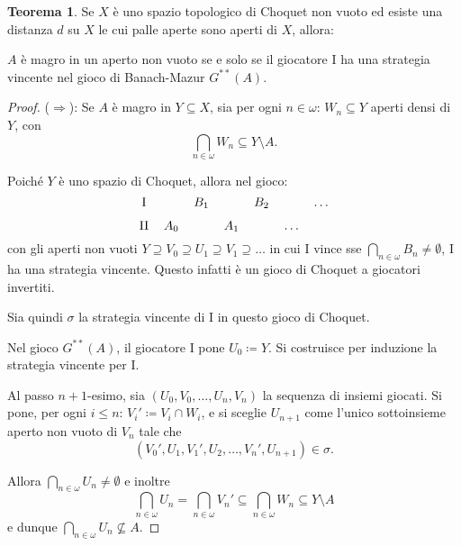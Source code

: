 \documentclass[titlepage]{article}
\newcommand{\1}{\mathds{1}}
\theoremstyle{definition}%
\newtheorem{thm}{Teorema}[section]
\theoremstyle{plain}
\theoremstyle{remark}
\begin{document}
\begin{thm}\label{sec:orged1da91}
Se \(X\) è uno {spazio topologico} {di Choquet} non {vuoto} ed esiste una {distanza} \(d\) su \(X\) le cui {palle aperte} sono aperti di \(X\), allora:

\(A\) è {magro} in un {aperto} non vuoto se e solo se il giocatore I ha una {strategia vincente} nel {gioco di Banach-Mazur} \(G^{**}(A)\).
\end{thm}
\begin{proof}
(\(\Rightarrow\)): Se \(A\) è magro in \(Y \subseteq X\), sia per ogni \(n \in \omega\): \(W_{n} \subseteq Y\) aperti densi di \(Y\), con
\begin{equation*}
\bigcap_{n \in\omega} W_{n} \subseteq Y \setminus A.
\end{equation*}

Poiché \(Y\) è uno spazio di Choquet, allora nel gioco:
\begin{equation*}
\begin{tikzcd}[ampersand replacement=\&,cramped, sep=tiny]
	{\text{I}} \&\& {B_1} \&\& {B_2} \&\& \dots \\
	{\text{II}} \& {A_0} \&\& {A_1} \&\& \dots
\end{tikzcd}
\end{equation*}
con gli aperti non vuoti \(Y\supseteq V_{0}\supseteq U_{1}\supseteq V_{1}\supseteq \dots\) in cui I vince sse \(\bigcap_{n \in \omega}{B_{n}} \neq \emptyset\), I ha una {strategia vincente}. Questo infatti è un gioco di Choquet a giocatori invertiti.

Sia quindi \(\sigma\) la strategia vincente di I in questo gioco di Choquet.

Nel gioco \(G^{**}(A)\), il giocatore I pone \(U_{0} \coloneqq Y\). Si costruisce per induzione la strategia vincente per I.

Al passo \(n+1\)-esimo, sia \((U_{0},V_{0},\dots, U_{n}, V_{n})\) la sequenza di insiemi giocati. Si pone, per ogni \(i\le n\): \(V_{i}'\coloneqq V_{i}\cap W_{i}\), e si sceglie \(U_{n+1}\) come l'unico sottoinsieme aperto non vuoto di \(V_{n}\) tale che
\begin{equation*}
(V_{0}', U_{1}, V_{1}', U_{2},\dots, V_{n}', U_{n+1}) \in\sigma.
\end{equation*}

Allora \(\bigcap_{n \in \omega} U_{n}\neq\emptyset\) e inoltre
\begin{equation*}
\bigcap_{n \in\omega} U_{n} = \bigcap_{n \in\omega} V_{n}' \subseteq \bigcap_{n \in \omega} W_{n} \subseteq Y\setminus A
\end{equation*}
e dunque \(\bigcap_{n \in\omega} U_{n} \not\subseteq A\).


\end{proof}
\end{document}
